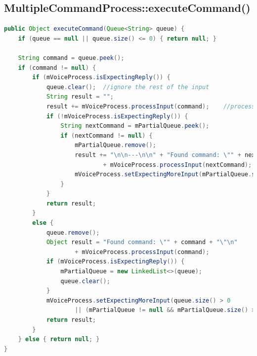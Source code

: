 \documentclass[11pt]{article}
\begin{document}
\subsection{MultipleCommandProcess::executeCommand()}
\label{appendix:multiple-commands-execute}
\begin{lstlisting}[language=Java, caption=MultipleCommandProcess.executeCommand()]
public Object executeCommand(Queue<String> queue) {
    if (queue == null || queue.size() <= 0) { return null; }

    String command = queue.peek();
    if (command != null) {
        if (mVoiceProcess.isExpectingReply()) {
            queue.clear();  //ignore the rest of the input
            String result = "";
            result += mVoiceProcess.processInput(command);    //process confirmation
            if (!mVoiceProcess.isExpectingReply()) {
                String nextCommand = mPartialQueue.peek();
                if (nextCommand != null) {
                    mPartialQueue.remove();
                    result += "\n\n---\n\n" + "Found command: \"" + nextCommand + "\"\n"
                            + mVoiceProcess.processInput(nextCommand);
                    mVoiceProcess.setExpectingMoreInput(mPartialQueue.size() > 0);
                }
            }
            return result;
        }
        else {
            queue.remove();
            Object result = "Found command: \"" + command + "\"\n"
                    + mVoiceProcess.processInput(command);
            if (mVoiceProcess.isExpectingReply()) {
                mPartialQueue = new LinkedList<>(queue);
                queue.clear();
            }
            mVoiceProcess.setExpectingMoreInput(queue.size() > 0
                    || (mPartialQueue != null && mPartialQueue.size() > 0));
            return result;
        }
    } else { return null; }
}
\end{lstlisting}

\newpage
\end{document}
